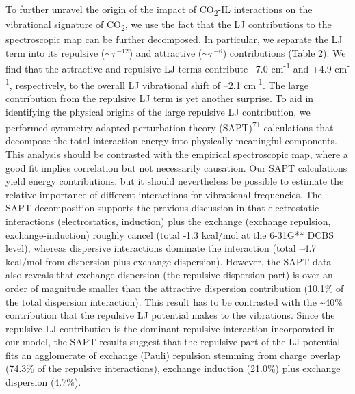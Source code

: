 \documentclass[]{article}
\begin{document}
To further unravel the origin of the impact of CO\textsubscript{2}-IL
interactions on the vibrational signature of CO\textsubscript{2}, we use
the fact that the LJ contributions to the spectroscopic map can be
further decomposed. In particular, we separate the LJ term into its
repulsive (\({\sim r}^{- 12}\)) and attractive (\(\sim r^{- 6}\))
contributions (Table 2). We find that the attractive and repulsive LJ
terms contribute --7.0 cm\textsuperscript{-1} and +4.9
cm\textsuperscript{-1}, respectively, to the overall LJ vibrational
shift of --2.1 cm\textsuperscript{-1}. The large contribution from the
repulsive LJ term is yet another surprise. To aid in identifying the
physical origins of the large repulsive LJ contribution, we performed
symmetry adapted perturbation theory (SAPT)\textsuperscript{71}
calculations that decompose the total interaction energy into physically
meaningful components. This analysis should be contrasted with the
empirical spectroscopic map, where a good fit implies correlation but
not necessarily causation. Our SAPT calculations yield energy
contributions, but it should nevertheless be possible to estimate the
relative importance of different interactions for vibrational
frequencies. The SAPT decomposition supports the previous discussion in
that electrostatic interactions (electrostatics, induction) plus the
exchange (exchange repulsion, exchange-induction) roughly cancel (total
‑1.3 kcal/mol at the 6-31G** DCBS level), whereas dispersive
interactions dominate the interaction (total ­--4.7 kcal/mol from
dispersion plus exchange-dispersion). However, the SAPT data also
reveals that exchange-dispersion (the repulsive dispersion part) is over
an order of magnitude smaller than the attractive dispersion
contribution (10.1\% of the total dispersion interaction). This result
has to be contrasted with the \textasciitilde{}40\% contribution that
the repulsive LJ potential makes to the vibrations. Since the repulsive
LJ contribution is the dominant repulsive interaction incorporated in
our model, the SAPT results suggest that the repulsive part of the LJ
potential fits an agglomerate of exchange (Pauli) repulsion stemming
from charge overlap (74.3\% of the repulsive interactions), exchange
induction (21.0\%) plus exchange dispersion (4.7\%).
\end{document}
